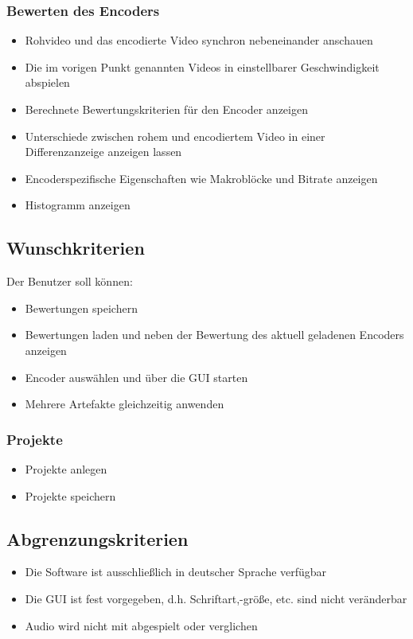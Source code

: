 \documentclass[parskip=full]{scrartcl}
\begin{document}
\subsubsection{Bewerten des Encoders}
\begin{itemize}
\item Rohvideo und das encodierte Video synchron nebeneinander anschauen
\item Die im vorigen Punkt genannten Videos in einstellbarer Geschwindigkeit abspielen
\item Berechnete Bewertungskriterien für den Encoder anzeigen
\item Unterschiede zwischen rohem und encodiertem Video in einer Differenzanzeige anzeigen lassen
\item Encoderspezifische Eigenschaften wie Makroblöcke und Bitrate anzeigen
\item Histogramm anzeigen
\end{itemize}
\subsection{Wunschkriterien}
Der Benutzer soll können:
\begin{itemize}
\item Bewertungen speichern
\item Bewertungen laden und neben der Bewertung des aktuell geladenen Encoders anzeigen
\item Encoder auswählen und über die GUI starten
\item Mehrere Artefakte gleichzeitig anwenden
\end{itemize}
\subsubsection{Projekte}
\begin{itemize}
\item Projekte anlegen
\item Projekte speichern
\end{itemize}
\subsection{Abgrenzungskriterien}
\begin{itemize}
\item Die Software ist ausschließlich in deutscher Sprache verfügbar
\item Die GUI ist fest vorgegeben, d.h. Schriftart,-größe, etc. sind nicht veränderbar
\item Audio wird nicht mit abgespielt oder verglichen
\end{itemize}
\newpage
\end{document}
